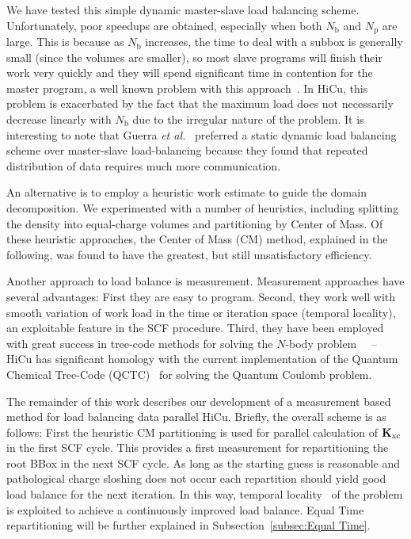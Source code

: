 \commentoutA{\documentclass[prl,aps,twocolumn,showpacs,twocolumngrid,superbib]{revtex4}}
\newcommand{\Kxc}{{\bf K}_{\mathrm{xc}}}
\newcommand{\Np}{N_{\mathrm{p}}} \newcommand{\Nbox}{N_{\mathrm{b}}}
\begin{document}
We have tested this simple dynamic master-slave load balancing
scheme. Unfortunately, poor speedups are obtained, especially when
both $\Nbox$ and $\Np$ are large.  This is because as $\Nbox$
increases, the time to deal with a subbox is generally small (since
the volumes are smaller), so most slave programs will finish their
work very quickly and they will spend significant time in contention for the
master program, a well known problem with this
approach~\cite{BWilkinson99,GWilson95}.  In HiCu, this problem is exacerbated by
the fact that the maximum load does not necessarily decrease linearly
with $\Nbox$ due to the irregular nature of the problem.  It is
interesting to note that Guerra {\it et al.}\/~\cite{Guerra_95}
preferred a static dynamic load balancing scheme over master-slave
load-balancing because they found that repeated distribution of data
requires much more communication.

An alternative is to employ a heuristic work estimate to guide the
domain decomposition.  We experimented with a number of heuristics,
including splitting the density into equal-charge volumes and
partitioning by Center of Mass.  Of these heuristic approaches, the
Center of Mass (CM) method, explained in the following, was
found to have the greatest, but still unsatisfactory efficiency.

Another approach to load balance is measurement.
Measurement approaches have several advantages: First they are easy
to program.  Second, they work well with smooth variation of work load in
the time or iteration space (temporal locality), an exploitable
feature in the SCF procedure.  Third, they have been employed with
great success in tree-code methods for solving the $N$-body problem~\cite{JPilkington96,warren:92_article,Grama94_article,Warren95b,Singh93,Singh_95v27,Grama_98v24} ~--~
HiCu has significant homology with the current implementation of the
Quantum Chemical Tree-Code (QCTC)~\cite{MChallacombe96,MChallacombe96B,MChallacombe97} for
solving the Quantum Coulomb problem.

The remainder of this work describes our development of a measurement
based method for load balancing data parallel HiCu.  Briefly, the
overall scheme is as follows: First the heuristic CM partitioning is
used for parallel calculation of $\Kxc$ in the first SCF cycle.  This
provides a first measurement for repartitioning the root BBox in the
next SCF cycle.  As long as the starting guess is reasonable and
pathological charge sloshing does not occur each repartition should
yield good load balance for the next iteration. In this way, temporal
locality~\cite{JPilkington96} of the problem is exploited to achieve
a continuously improved load balance. Equal Time repartitioning
will be further explained in Subsection~\ref{subsec:Equal Time}.
\end{document}
